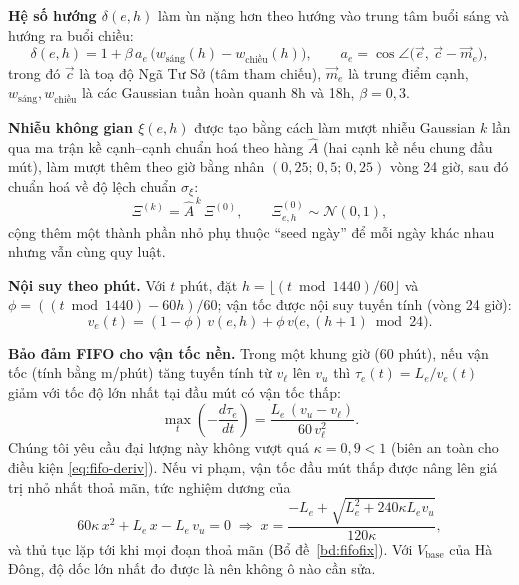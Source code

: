 \textbf{Hệ số hướng $\delta(e,h)$} làm ùn nặng hơn theo hướng vào trung tâm buổi sáng và hướng ra buổi chiều:
\begin{equation}
\delta(e,h) = 1 + \beta\, a_e\,\bigl(w_{\text{sáng}}(h)-w_{\text{chiều}}(h)\bigr), \qquad
a_e = \cos\angle\bigl(\vec{e},\, \vec{c}-\vec{m}_e\bigr),
\label{eq:direction}
\end{equation}
trong đó $\vec{c}$ là toạ độ Ngã Tư Sở (tâm tham chiếu), $\vec{m}_e$ là trung điểm cạnh, $w_{\text{sáng}}, w_{\text{chiều}}$
là các Gaussian tuần hoàn quanh 8h và 18h, $\beta=0{,}3$.

\textbf{Nhiễu không gian $\xi(e,h)$} được tạo bằng cách làm mượt nhiễu Gaussian $k$ lần qua ma trận kề cạnh--cạnh chuẩn
hoá theo hàng $\hat{A}$ (hai cạnh kề nếu chung đầu mút), làm mượt thêm theo giờ bằng nhân $(0{,}25;\,0{,}5;\,0{,}25)$ vòng
24 giờ, sau đó chuẩn hoá về độ lệch chuẩn $\sigma_\xi$:
\begin{equation}
\Xi^{(k)} = \hat{A}^{\,k}\,\Xi^{(0)}, \qquad \Xi^{(0)}_{e,h}\sim\mathcal{N}(0,1),
\label{eq:smooth}
\end{equation}
cộng thêm một thành phần nhỏ phụ thuộc ``seed ngày'' để mỗi ngày khác nhau nhưng vẫn cùng quy luật.

\textbf{Nội suy theo phút.} Với $t$ phút, đặt $h=\lfloor (t \bmod 1440)/60\rfloor$ và $\phi=((t\bmod 1440)-60h)/60$; vận tốc
được nội suy tuyến tính (vòng 24 giờ):
\begin{equation}
v_e(t) = (1-\phi)\,v(e,h) + \phi\, v\bigl(e,(h+1)\bmod 24\bigr).
\label{eq:interp}
\end{equation}

\textbf{Bảo đảm FIFO cho vận tốc nền.} Trong một khung giờ (60 phút), nếu vận tốc (tính bằng m/phút) tăng tuyến tính từ
$v_\ell$ lên $v_u$ thì
$\tau_e(t)=L_e/v_e(t)$ giảm với tốc độ lớn nhất tại đầu mút có vận tốc thấp:
\begin{equation}
\max_t\left(-\frac{d\tau_e}{dt}\right) = \frac{L_e\,(v_u-v_\ell)}{60\,v_\ell^{2}}.
\label{eq:slope}
\end{equation}
Chúng tôi yêu cầu đại lượng này không vượt quá $\kappa=0{,}9<1$ (biên an toàn cho điều kiện \eqref{eq:fifo-deriv}).
Nếu vi phạm, vận tốc đầu mút thấp được nâng lên giá trị nhỏ nhất thoả mãn, tức nghiệm dương của
\begin{equation}
60\kappa\, x^2 + L_e\, x - L_e\, v_u = 0 \;\Longrightarrow\;
x = \frac{-L_e + \sqrt{L_e^2 + 240\kappa L_e v_u}}{120\kappa},
\label{eq:fifo-fix}
\end{equation}
và thủ tục lặp tới khi mọi đoạn thoả mãn (Bổ đề~\ref{bd:fifofix}). Với $V_{\text{base}}$ của Hà Đông, độ dốc lớn nhất
đo được là \FifoSlope{} nên không ô nào cần sửa.

